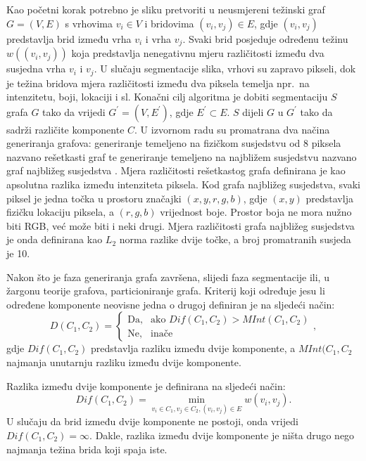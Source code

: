 \documentclass[times, utf8, diplomski]{fer}
\begin{document}
Kao početni korak potrebno je sliku pretvoriti u neusmjereni težinski graf  $G = (V,E)$ s vrhovima  $v_i \in V$ i bridovima  $(v_i, v_j) \in E$, gdje $(v_i,v_j)$ predstavlja brid između vrha $v_i$ i vrha $v_j$. Svaki brid posjeduje određenu težinu $w((v_i,v_j))$ koja predstavlja nenegativnu mjeru različitosti  između dva susjedna vrha $v_i$ i $v_j$. U slučaju segmentacije slika, vrhovi su zapravo pikseli, dok je težina bridova mjera različitosti između dva piksela temelja npr.\ na intenzitetu, boji, lokaciji i sl. Konačni cilj algoritma je dobiti segmentaciju $S$ grafa $G$ tako da vrijedi $G^{'} = (V, E^{'})$, gdje $E^{'} \subset E$. $S$ dijeli $G$ u $G^{'}$ tako da sadrži različite komponente  $C$. U izvornom radu \citep{Felzenszwalb2004} su promatrana dva načina generiranja grafova: generiranje temeljeno na fizičkom susjedstvu od 8 piksela nazvano rešetkasti graf  te generiranje temeljeno na najbližem susjedstvu nazvano graf najbližeg susjedstva . Mjera različitosti rešetkastog grafa definirana je kao apsolutna razlika između intenziteta piksela. Kod grafa najbližeg susjedstva, svaki piksel je jedna točka u prostoru značajki $(x,y,r,g,b)$, gdje $(x,y)$ predstavlja fizičku lokaciju piksela, a $(r,g,b)$ vrijednost boje. Prostor boja ne mora nužno biti RGB, već može biti i neki drugi. Mjera različitosti grafa najbližeg susjedstva je onda definirana kao $L_2$ norma razlike dvije točke, a broj promatranih susjeda je 10.

Nakon što je faza generiranja grafa završena, slijedi faza segmentacije ili, u žargonu teorije grafova, particioniranje grafa. Kriterij  koji određuje jesu li određene komponente neovisne  jedna o drugoj definiran je na sljedeći način:
\begin{equation}
    D(C_1,C_2) =
    \begin{cases}
        \mbox{Da,} & \mbox{ako }Dif(C_1,C_2) > MInt(C_1,C_2) \\
        \mbox{Ne,} & \mbox{inače}
    \end{cases},
\end{equation}
gdje $Dif(C_1,C_2)$ predstavlja razliku između dvije komponente, a $MInt(C_1,C_2$ najmanja unutarnju razliku između dvije komponente.

Razlika između dvije komponente je definirana na sljedeći način:
\begin{equation}
    Dif(C_1,C_2) = \min_{v_i \in C_1, v_j \in C_2, (v_i,v_j) \in E} w(v_i,v_j).
\end{equation}
U slučaju da brid između dvije komponente ne postoji, onda vrijedi $Dif(C_1,C_2) = \infty$. Dakle, razlika između dvije komponente je ništa drugo nego najmanja težina brida koji spaja iste.
\end{document}
